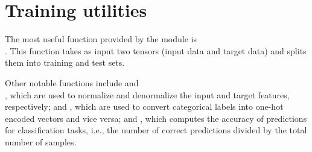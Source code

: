 \section{Training utilities} \label{sec:training-utilities}

The most useful function provided by the  module is\\. This function takes as input two tensors (input data and target data) and splits them into training and test sets.

Other notable functions include  and\\, which are used to normalize and denormalize the input and target features, respectively;  and , which are used to convert categorical labels into one-hot encoded vectors and vice versa; and , which computes the accuracy of predictions for classification tasks, i.e., the number of correct predictions divided by the total number of samples.
